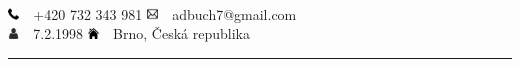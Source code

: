 \documentclass[a4paper,11pt]{article}
\begin{document}
\begin{paracol}{2}
\begin{leftcolumn}
\begin{flushright}
        \end{flushright}

    \end{leftcolumn}

    \begin{rightcolumn}

        \vspace*{1pt}
         \vspace{0.5cm} \\
        \hspace*{0.5cm} \includegraphics[width=0.3cm]{phone.png}~~+420 732 343 981 \hfill \includegraphics[width=0.3cm]{email.png}~~adbuch7@gmail.com \hspace*{2cm} \vspace{0.4cm} \\
        \hspace*{0.5cm} \includegraphics[width=0.3cm]{person.png}~~7.2.1998 \hfill \includegraphics[width=0.3cm]{house.png}~~Brno, Česká republika   \hspace*{2cm} \vspace{8pt} \\
        \rule{\linewidth}{0.5pt}

        \vspace{32pt}
        \begin{parcolumns}[colwidths={1=0.3\textwidth}]{2}
        \end{parcolumns}

        \vspace{5pt}
        \begin{parcolumns}[colwidths={1=0.3\textwidth}]{2}
        \end{parcolumns}




\end{rightcolumn}
\end{paracol}
\end{document}
